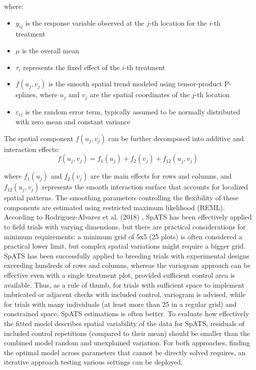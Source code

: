 \documentclass[12pt,a4paper,oneside]{report}
\begin{document}
where: 
\begin{itemize} 
    \item $y_{ij}$ is the response variable observed at the $j$-th location for the $i$-th treatment 
    \item $\mu$ is the overall mean \item $\tau_i$ represents the fixed effect of the $i$-th treatment 
    \item $f(u_j, v_j)$ is the smooth spatial trend modeled using tensor-product P-splines, where $u_j$ and $v_j$ are the spatial coordinates of the $j$-th location 
    \item $\varepsilon_{ij}$ is the random error term, typically assumed to be normally distributed with zero mean and constant variance 
\end{itemize}

The spatial component $f(u_j, v_j)$ can be further decomposed into additive and 
interaction effects: 
\[
f(u_j, v_j) = f_1(u_j) + f_2(v_j) + f_{12}(u_j, v_j)
\]

where $f_1(u_j)$ and $f_2(v_j)$ are the main effects for rows and columns, 
and $f_{12}(u_j, v_j)$ represents the smooth interaction surface that accounts 
for localized spatial patterns. The smoothing parameters controlling the flexibility 
of these components are estimated using restricted maximum likelihood (REML).
According to Rodriguez-Alvarez et al. (2018) 
\cite{rodriguez-alvarezCorrectingSpatialHeterogeneity2018}, 
SpATS has been effectively applied 
to field trials with varying dimensions, but there are practical considerations 
for minimum requirements: a minimum grid of 5x5 (25 plots) is often considered a 
practical lower limit, but complex spatial variations might require a bigger grid.
SpATS has been successfully applied to breeding trials with experimental designs 
exceeding hundreds of rows and columns, whereas the variogram approach can be effective 
even with a single treatment plot, provided sufficient control area is available.
Thus, as a rule of thumb, for trials with sufficient space to implement imbricated
or adjacent checks with included control, variogram is advised,
while for trials with many individuals (at least more than 25 in a regular grid) 
and constrained space, SpATS estimations is often better.
To evaluate how effectively the fitted model describes spatial variability of the 
data for SpATS, 
residuals of included control repetitions (compared to their mean) should be 
smaller than the combined model random and unexplained variation.
For both approaches, finding the optimal model across parameters that cannot be 
directly solved requires, 
an iterative approach testing various settings can be deployed. 
\end{document}
